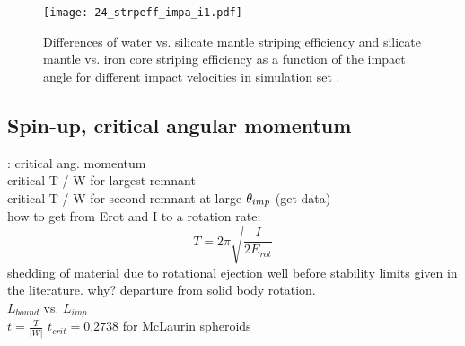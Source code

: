 {\begin{landscape}
\begin{figure}
\begin{center}
\texttt{[image: 24\_strpeff\_impa\_i1.pdf]}
\caption{Differences of water vs. silicate mantle striping efficiency and silicate mantle vs. iron core striping efficiency as a function of the impact angle for different impact velocities in simulation set \iss.}
\label{ch03_fig24b}
\end{center}
\end{figure}
\end{landscape}
}


\subsection{Spin-up, critical angular momentum}
\cite{Canup:2000p3542}: critical ang. momentum\\
critical T / W for largest remnant\\
critical T / W for second remnant at large $\theta_{imp}$ (get data)\\
how to get from Erot and I to a rotation rate:
\begin{equation}
T = 2 \pi \sqrt{ \frac{I}{2 E_{rot}} }
\end{equation}
shedding of material due to rotational ejection well before stability limits given in the literature. why? departure from solid body rotation.\\
$L_{bound}$ vs. $L_{imp}$ \\
$t = \frac{T}{|W|}$
$t_{crit} = 0.2738$ for McLaurin spheroids \citep{1987gady.book.....B} \citep{chandrasekhar1969ellipsoidal}


